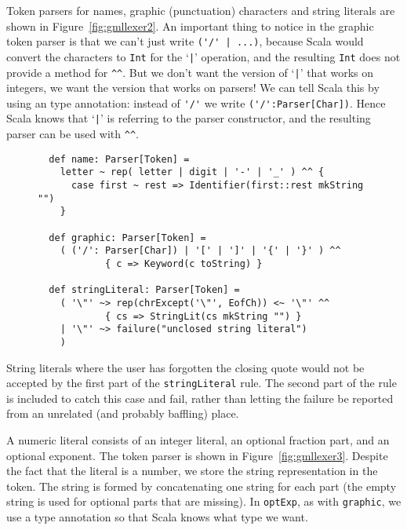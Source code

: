 Token parsers for names, graphic (punctuation) characters
and string literals are shown in Figure~\ref{fig:gmllexer2}.
An important thing to notice in the graphic token parser
is that we can't just write \verb!('/' | ...)!,
because Scala would
convert the characters to \verb!Int! for the `\verb!|!' operation,
and the resulting \verb!Int! does not provide a method for \verb!^^!.
But we don't want the version of `\verb!|!' that works on integers,
we want the version that works on parsers!
We can tell Scala this by using an type annotation:
instead of \verb!'/'! we write \verb!('/':Parser[Char])!.
Hence Scala knows that `\verb!|!' is referring to the parser constructor,
and the resulting parser can be used with \verb!^^!.

\begin{figure}
\begin{verbatim}
  def name: Parser[Token] =
    letter ~ rep( letter | digit | '-' | '_' ) ^^ {
      case first ~ rest => Identifier(first::rest mkString "")
    }

  def graphic: Parser[Token] =
    ( ('/': Parser[Char]) | '[' | ']' | '{' | '}' ) ^^
            { c => Keyword(c toString) }

  def stringLiteral: Parser[Token] =
    ( '\"' ~> rep(chrExcept('\"', EofCh)) <~ '\"' ^^
            { cs => StringLit(cs mkString "") }
    | '\"' ~> failure("unclosed string literal")
    )
\end{verbatim}
\getcaption
\end{figure}

String literals where the user has forgotten the closing quote
would not be accepted by the first part of the \verb!stringLiteral! rule.
The second part of the rule is included to catch this case and fail,
rather than letting the failure be reported
from an unrelated (and probably baffling) place.

A numeric literal consists of an integer literal,
an optional fraction part, and an optional exponent.
The token parser is shown in Figure~\ref{fig:gmllexer3}.
Despite the fact that the literal is a number,
we store the string representation in the token.
The string is formed by concatenating one string for each part
(the empty string is used for optional parts that are missing).
In \verb!optExp!, as with \verb!graphic!,
we use a type annotation so that Scala knows what type we want.

